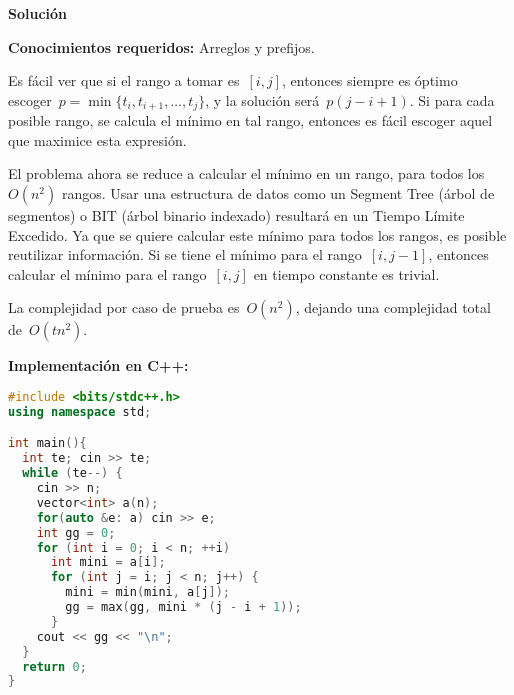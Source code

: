 \vspace*{0cm}
{\Large\textbf{Solución}}

\textbf{Conocimientos requeridos:} Arreglos y prefijos.

Es fácil ver que si el rango a tomar es~$[i, j]$, entonces siempre es óptimo
escoger~$p = \min \{t_i, t_{i + 1}, \dots, t_j\}$, y la solución
será~$p (j - i + 1)$. Si para cada posible rango, se calcula el mínimo en tal rango,
entonces es fácil escoger aquel que maximice esta expresión.

El problema ahora se reduce a calcular el mínimo en un rango, para todos los~$O(n^2)$
rangos. Usar una estructura de datos como un Segment Tree (árbol de segmentos) o BIT
(árbol binario indexado) resultará en un Tiempo Límite Excedido. Ya que se quiere
calcular este mínimo para todos los rangos, es posible reutilizar información. Si se
tiene el mínimo para el rango~$[i, j - 1]$, entonces calcular el mínimo para el
rango~$[i, j]$ en tiempo constante es trivial.

La complejidad por caso de prueba es~$O(n^2)$, dejando una complejidad total
de~$O(tn^2)$.

\textbf{Implementación en C++:}

\begin{lstlisting}[language=C++]
#include <bits/stdc++.h>
using namespace std;

int main(){
  int te; cin >> te;
  while (te--) {
    cin >> n;
    vector<int> a(n);
    for(auto &e: a) cin >> e;
    int gg = 0;
    for (int i = 0; i < n; ++i)
      int mini = a[i];
      for (int j = i; j < n; j++) {
        mini = min(mini, a[j]);
        gg = max(gg, mini * (j - i + 1));
      }
    cout << gg << "\n";
  }
  return 0;
}
\end{lstlisting}

\newpage

